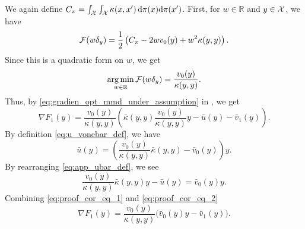 We again define $C_\pi = \int_{\mathcal{X}} \int_{\mathcal{X}} \kappa(x,x^{\prime}) \,\mathrm{d}\pi(x) \mathrm{d}\pi(x^{\prime})$. First, for $w \in \mathbb{R}$ and $y \in \mathcal{X}$, we have
\begin{equation}
    \mathcal{F}(w\delta_{y}) = \frac{1}{2} \left( C_\pi- 2 w v_{0}(y) + w^2 \kappa(y,y) \right).
\end{equation}
Since this is a quadratic form on $w$, we get
\begin{equation}
    \operatorname*{arg\,min}\limits_{w \in \mathbb{R}} \mathcal{F}(w\delta_{y}) = \frac{v_{0}(y)}{\kappa(y,y)}.
\end{equation}
Thus, by \eqref{eq:gradien_opt_mmd_under_assumption} in , we get 
\begin{equation}\label{eq:proof_cor_eq_1}
    \nabla F_{1}(y)  =  \frac{v_{0}(y)}{\kappa(y,y)}\left(\bar{\kappa}(y,y) \frac{v_{0}(y)}{\kappa(y,y)} y - \bar{u}(y) - \bar{v}_{1}(y) \right).    
\end{equation}
By definition \eqref{eq:u_vonebar_def}, we have
\begin{equation}\label{eq:app_ubar_def}
    \bar{u}(y) = \left( \frac{v_{0}(y)}{\kappa(y,y)} \bar{\kappa}(y,y) - \bar{v}_{0}(y) \right) y.
\end{equation}
By rearranging \eqref{eq:app_ubar_def}, we see
\begin{equation}\label{eq:proof_cor_eq_2}
  \frac{v_{0}(y)}{\kappa(y,y)} \bar{\kappa}(y,y) y-   \bar{u}(y) = \bar{v}_{0}(y) y.
\end{equation}
Combining \eqref{eq:proof_cor_eq_1} and \eqref{eq:proof_cor_eq_2}
\begin{equation}
    \nabla F_{1}(y)  =  \frac{v_{0}(y)}{\kappa(y,y)}\Big(\bar{v}_{0}(y) y - \bar{v}_{1}(y) \Big).
\end{equation}









